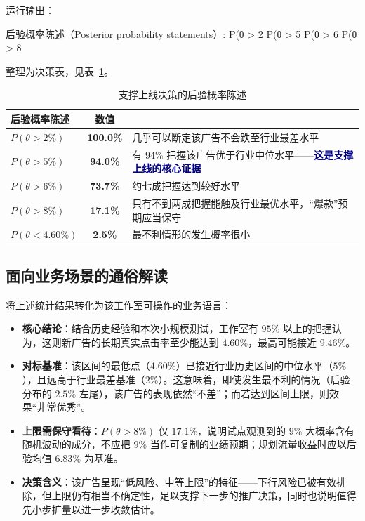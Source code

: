 \documentclass[12pt,a4paper,UTF8,fontset=none]{ctexart}
\newcommand{\thead}[1]{\sffamily\bfseries\color{navy}#1}
\newcommand{\tht}{\theta}
\newcommand{\emphc}[1]{\textcolor{navy}{\textbf{#1}}}
\begin{document}
运行输出：

\begin{runout}
后验概率陈述（Posterior probability statements）:
    P(θ > 2%
    P(θ > 5%
    P(θ > 6%
    P(θ > 8%
\end{runout}

整理为决策表，见表~\ref{tab:decision}。

\begin{table}[H]
\centering
\caption{支撑上线决策的后验概率陈述}
\label{tab:decision}
\begin{tabular}{l c >{\raggedright\arraybackslash}p{8.4cm}}
\toprule
\thead{后验概率陈述} & \thead{数值} & \multicolumn{1}{l}{\thead{业务含义}} \\
\midrule
$P(\tht>2\%)$      & \textbf{100.0\%} & 几乎可以断定该广告不会跌至行业最差水平 \\
\rowcolor{softbg} $P(\tht>5\%)$      & \textbf{94.0\%}  & 有 94\% 把握该广告优于行业中位水平——\emphc{这是支撑上线的核心证据} \\
$P(\tht>6\%)$      & \textbf{73.7\%}  & 约七成把握达到较好水平 \\
\rowcolor{softbg} $P(\tht>8\%)$      & \textbf{17.1\%}  & 只有不到两成把握能触及行业最优水平，“爆款”预期应当保守 \\
$P(\tht<4.60\%)$   & \textbf{2.5\%}   & 最不利情形的发生概率很小 \\
\bottomrule
\end{tabular}
\end{table}

\subsection{面向业务场景的通俗解读}

将上述统计结果转化为该工作室可操作的业务语言：

\begin{itemize}
  \item \textbf{核心结论}：结合历史经验和本次小规模测试，工作室有 $95\%$ 以上的把握认为，这则新广告的长期真实点击率至少能达到 $4.60\%$，最高可能接近 $9.46\%$。
  \item \textbf{对标基准}：该区间的最低点（$4.60\%$）已接近行业历史区间的中位水平（$5\%$），且远高于行业最差基准（$2\%$）。这意味着，即使发生最不利的情况（后验分布的 $2.5\%$ 左尾），该广告的表现依然“不差”；而若达到区间上限，则效果“非常优秀”。
  \item \textbf{上限需保守看待}：$P(\tht>8\%)$ 仅 $17.1\%$，说明试点观测到的 $9\%$ 大概率含有随机波动的成分，不应把 $9\%$ 当作可复制的业绩预期；规划流量收益时应以后验均值 $6.83\%$ 为基准。
  \item \textbf{决策含义}：该广告呈现“低风险、中等上限”的特征——下行风险已被有效排除，但上限仍有相当不确定性，足以支撑下一步的推广决策，同时也说明值得先小步扩量以进一步收敛估计。
\end{itemize}
\end{document}

